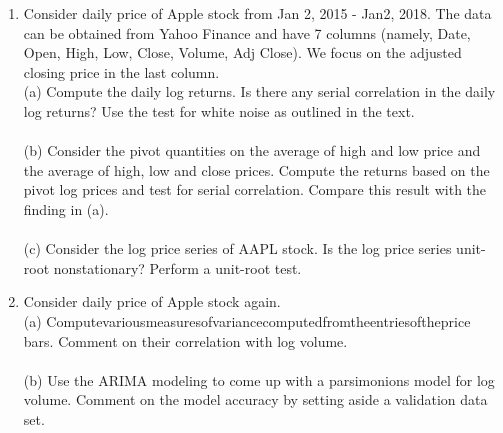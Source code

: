 \documentclass{article}
\begin{document}
\begin{enumerate}
\item{Consider daily price of Apple stock from Jan 2, 2015 - Jan2, 2018. The data can be obtained from Yahoo Finance and have 7 columns (namely, Date, Open, High, Low, Close, Volume, Adj Close). We focus on the adjusted closing price in the last column.} \\
(a) Compute the daily log returns. Is there any serial correlation in the daily log returns? Use the test for white noise as outlined in the text.\\
~\\
(b) Consider the pivot quantities on the average of high and low price and the average of high, low and close prices. Compute the returns based on the pivot log prices and test for serial correlation. Compare this result with the finding in (a).\\
~\\
(c) Consider the log price series of AAPL stock. Is the log price series unit-root nonstationary? Perform a unit-root test.

\item{Consider daily price of Apple stock again.}
~\\
(a) Computevariousmeasuresofvariancecomputedfromtheentriesoftheprice bars. Comment on their correlation with log volume.\\
~\\
(b) Use the ARIMA modeling to come up with a parsimonions model for log volume. Comment on the model accuracy by setting aside a validation data set.

\end{enumerate}
\end{document}
